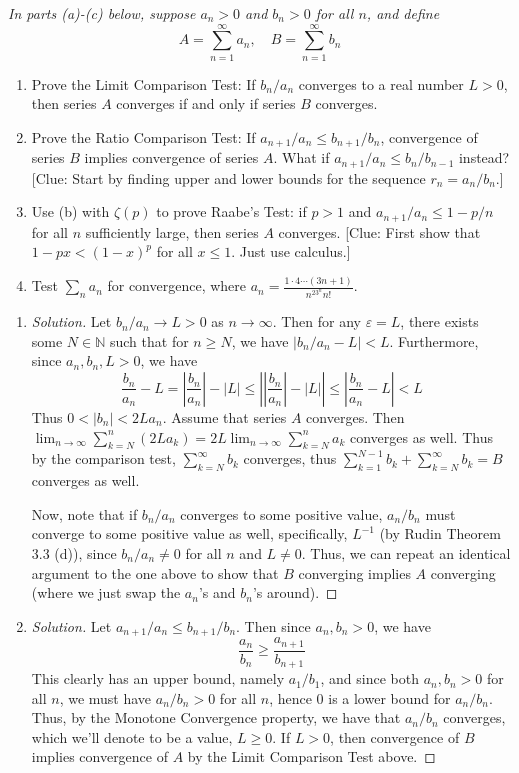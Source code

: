 \documentclass{article}
\newcommand{\N}{{\mathbb N}}
\newcommand{\ep}{{\varepsilon}}
\begin{document}
{\it In parts (a)-(c) below, suppose $a_n > 0$ and $b_n > 0$ for all $n$, and define
\[
	A = \sum_{n=1}^\infty a_n, \quad B = \sum_{n=1}^\infty b_n
\]
\begin{enumerate}
	\item Prove the Limit Comparison Test:
		If $b_n/a_n$ converges to a real number $L > 0$,
		then series $A$ converges if and only if series $B$ converges.
	\item Prove the Ratio Comparison Test:
		If $a_{n+1}/a_n \leq b_{n+1}/b_n$, convergence of series $B$
		implies convergence of series $A$.
		What if $a_{n+1}/a_n \leq b_n/b_{n-1}$ instead?
		[Clue: Start by finding upper and lower bounds for the sequence $r_n = a_n/b_n$.]
	\item Use (b) with $\zeta(p)$ to prove Raabe's Test:
		if $p > 1$ and $a_{n+1}/a_n \leq 1 - p/n$ for all $n$ sufficiently large,
		then series $A$ converges.
		[Clue: First show that $1-px < (1-x)^p$ for all $x \leq 1$. Just use calculus.]
	\item Test $\sum_n a_n$ for convergence,
		where $a_n = \frac{1\cdot 4 \cdots (3n+1)}{n^23^nn!}$.
\end{enumerate}

\begin{enumerate}
	\item \begin{proof}[Solution]\let\qed\relax
		Let $b_n/a_n \to L > 0$ as $n \to \infty$.
		Then for any $\ep = L$,
		there exists some $N \in \N$ such that for $n \geq N$,
		we have $|b_n/a_n - L| < L$.
		Furthermore, since $a_n,b_n,L > 0$, we have
		\[
			\frac{b_n}{a_n} - L = \left\lvert\frac{b_n}{a_n}\right\rvert - |L|
			\leq \left\lvert\left\lvert\frac{b_n}{a_n}\right\rvert - |L|\right\rvert
			\leq \left\lvert \frac{b_n}{a_n} - L \right\rvert  < L
		\]
		Thus $0 < |b_n| < 2La_n$.
		Assume that series $A$ converges.
		Then $\lim_{n \to \infty} \sum_{k=N}^n (2La_k) = 2L\lim_{n \to \infty} \sum_{k=N}^n a_k$
		converges as well.
		Thus by the comparison test,
		$\sum_{k=N}^\infty b_k$ converges,
		thus $\sum_{k=1}^{N-1}b_k + \sum_{k=N}^\infty b_k = B$
		converges as well.

		Now, note that if $b_n/a_n$ converges to some positive value,
		$a_n/b_n$ must converge to some positive value as well,
		specifically, $L^{-1}$
		(by Rudin Theorem 3.3 (d)),
		since $b_n/a_n \neq0$ for all $n$ and $L\neq0$.
		Thus, we can repeat an identical argument to the one above
		to show that $B$ converging implies $A$ converging
		(where we just swap the $a_n$'s and $b_n$'s around).
	\end{proof}
	\item \begin{proof}[Solution]\let\qed\relax
		Let $a_{n+1}/a_n \leq b_{n+1}/b_n$.
		Then since $a_n,b_n > 0$, we have
		\[
			\frac{a_n}{b_n} \geq \frac{a_{n+1}}{b_{n+1}}
		\]
		This clearly has an upper bound,
		namely $a_1/b_1$,
		and since both $a_n,b_n > 0$ for all $n$, we must have
		$a_n/b_n > 0$ for all $n$,
		hence $0$ is a lower bound for $a_n/b_n$.
		Thus, by the Monotone Convergence property,
		we have that $a_n/b_n$ converges,
		which we'll denote to be a value, $L \geq 0$.
		If $L > 0$,
		then convergence of $B$ implies convergence of $A$
		by the Limit Comparison Test above.


\end{proof}
\end{enumerate}}
\end{document}
